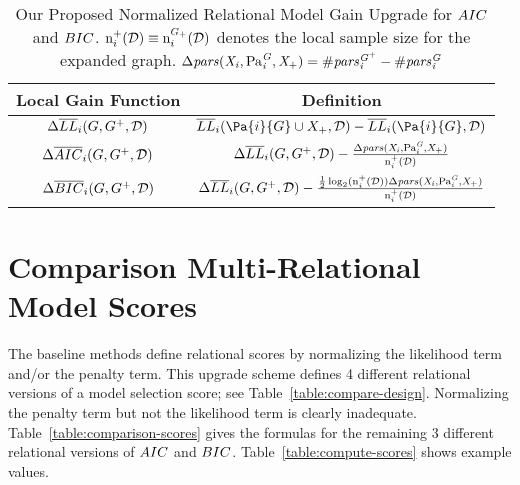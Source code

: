 \documentclass[letterpaper]{article}
\begin{document}
\begin{table*}[htbp] \centering
\begin{tabular}{| c | c |}
	 \hline Local Gain Function & Definition \\ \hline
$\gain{\improve{\nscore{\loglikelihood}}}{i}{\graph}{\dstructure}$ & 
$\score{\nscore{\loglikelihood}}{i}{\Pa{i}{\graph}\cup\node_{+}}{\dstructure} -
\score{\nscore{\loglikelihood}}{i}{\Pa{i}{\graph}}{\dstructure} $
\\ \hline
$\gain{\improve{\nscore{\aic}}}{i}{\graph}{\dstructure}$ & 
$\gain{\improve{\nscore{\loglikelihood}}}{i}{\graph}{\dstructure} - \frac{\parloss{i}{\graph}}{\Fcount{+}{i}{\dstructure}}$
\\ \hline
$\gain{\improve{\nscore{\bic}}}{i}{\graph}{\dstructure}$ & $\gain{\improve{\nscore{\loglikelihood}}}{i}{\graph}{\dstructure} - \frac{\frac{1}{2}\log_{2}(\Fcount{+}{i}{\dstructure}) \parloss{i}{\graph}}{\Fcount{+}{i}{\dstructure}}$
\\ \hline
\end{tabular}
\caption{Our Proposed Normalized Relational Model Gain Upgrade for $\aic$ and $\bic$. $\Fcount{+}{i}{\dstructure} \equiv \Fcount{\graph_{+}}{i}{\dstructure}$ denotes the local sample size for the expanded graph. $\parloss{i}{\graph} = \numpars{\graph^{+}}{i} - \numpars{\graph}{i}$ \label{table:gains}}
\end{table*}

\section{Comparison Multi-Relational \\Model Scores} \label{sec:scores}

The baseline methods  define relational scores by normalizing the likelihood term and/or the penalty term. This upgrade scheme defines 4 different relational versions of a model selection score; see Table~\ref{table:compare-design}. Normalizing the penalty term but not the likelihood term is clearly inadequate. Table~\ref{table:comparison-scores} gives the formulas for the remaining 3 different relational versions of $\aic$ and $\bic$. Table~\ref{table:compute-scores} shows example values. 

\begin{table} \caption{Available options for each score, depending on whether rescaling the likelihood count and/or the penalty term. %
} 
\label{table:compare-design}
\end{table}
\end{document}
